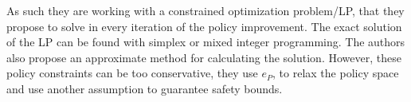 As such they are working with a constrained optimization problem/LP, that they propose to solve in every iteration of the policy improvement. The exact solution of the LP can be found with simplex or mixed integer programming. The authors also propose an approximate method for calculating the solution.
However, these policy constraints can be too conservative, they use $e_P$, to relax the policy space and use another assumption to guarantee safety bounds. 
    